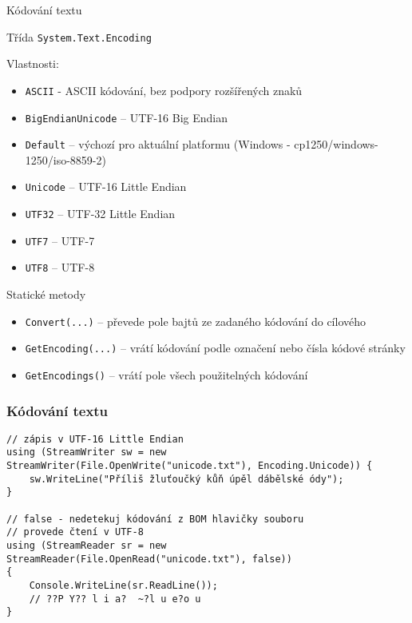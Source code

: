 \begin{frame}[fragile]
\begin{bitemize}{Kódování textu}
\item Třída \lstinline|System.Text.Encoding|
\item Vlastnosti:
\begin{itemize}
\item \lstinline|ASCII| - ASCII kódování, bez podpory rozšířených znaků
\item \lstinline|BigEndianUnicode| -- UTF-16 Big Endian
\item \lstinline|Default| -- výchozí pro aktuální platformu (Windows - cp1250/windows-1250/iso-8859-2)
\item \lstinline|Unicode| -- UTF-16 Little Endian
\item \lstinline|UTF32| -- UTF-32 Little Endian
\item \lstinline|UTF7| -- UTF-7
\item \lstinline|UTF8| -- UTF-8
\end{itemize}
\item Statické metody
\begin{itemize}
\item \lstinline|Convert(...)| -- převede pole bajtů ze zadaného kódování do cílového
\item \lstinline|GetEncoding(...)| -- vrátí kódování podle označení nebo čísla kódové stránky
\item \lstinline|GetEncodings()| -- vrátí pole všech použitelných kódování
\end{itemize}

\end{bitemize}
\end{frame}



\begin{frame}[fragile]
\frametitle{Kódování textu}
\begin{yesblock}
\begin{lstlisting}
// zápis v UTF-16 Little Endian
using (StreamWriter sw = new StreamWriter(File.OpenWrite("unicode.txt"), Encoding.Unicode)) {
    sw.WriteLine("Příliš žluťoučký kůň úpěl dábělské ódy");
}

// false - nedetekuj kódování z BOM hlavičky souboru
// provede čtení v UTF-8
using (StreamReader sr = new StreamReader(File.OpenRead("unicode.txt"), false))
{
    Console.WriteLine(sr.ReadLine());
    // ??P Y?? l i a?  ~?l u e?o u
}
\end{lstlisting}
\end{yesblock}
\end{frame}



